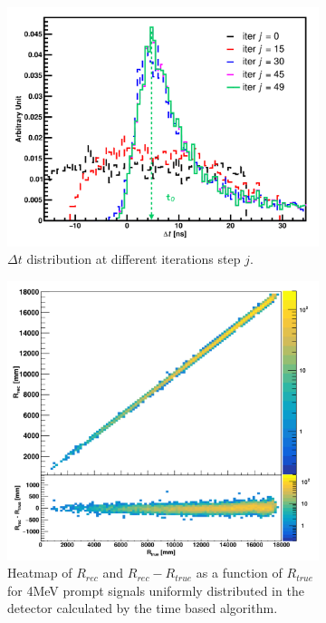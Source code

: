 \documentclass[../main.tex]{subfiles}
\begin{document}
\begin{figure}
  \begin{subfigure}[t]{0.48\textwidth}
    \centering
    \includegraphics[width=\textwidth]{images/juno/reco/delta_t_peak_distrib.png}
    \caption{$\Delta t$ distribution at different iterations step $j$.}
    \label{fig:juno:rec:delta_t_distrib}
  \end{subfigure}
  \hfill
  \begin{subfigure}[t]{0.48\textwidth}
    \centering
    \includegraphics[width=\textwidth]{images/juno/reco/time_based_algorithm.png}
    \caption{Heatmap of $R_{rec}$ and $R_{rec} - R_{true}$ as a function of $R_{true}$ for 4MeV prompt signals uniformly distributed in the detector calculated by the time based algorithm.}
    \label{fig:juno:rec:time_based_results}
  \end{subfigure}
  \caption{}
\end{figure}
\end{document}
